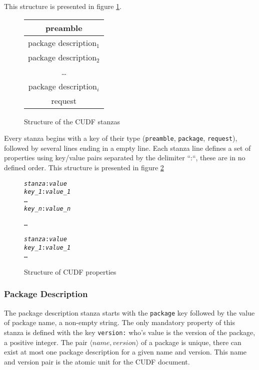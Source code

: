 This structure is presented in figure \ref{formal:cudfstruct}.

\begin{figure}[htp]
\centering
\begin{tabular}{|c|}
\hline preamble \\ \hline
\hline package description$_{1}$ \\ \hline
\hline package description$_{2}$ \\ \hline
 \multicolumn{1}{c}{\ldots}  \\ 
\hline package description$_{i}$\\ \hline
\hline request\\ \hline
\end{tabular}
\caption{Structure of the CUDF stanzas}
\label{formal:cudfstruct}
\end{figure}

Every stanza begins with a key of their type (\verb+preamble+, \verb+package+, \verb+request+), followed by several lines ending in a empty line.
Each stanza line defines a set of properties using key/value pairs separated by the delimiter ``:``, these are in no defined order.
This structure is presented in figure \ref{formal.cudfproperties}

\begin{figure}[htp] 
\begin{center}
\begin{alltt}
\textit{stanza}: \textit{value}
\textit{key_1}: \textit{value_1}
\ldots
\textit{key_n}: \textit{value_n}

\ldots

\textit{stanza}: \textit{value}
\textit{key_1}: \textit{value_1}
\ldots
\end{alltt}
  \caption[CUDF property structure]{Structure of CUDF properties}
  \label{formal.cudfproperties}
\end{center}
\end{figure}

\subsubsection{Package Description}
The package description stanza starts with the \verb+package+ key followed by the value of package name, a non-empty string.
The only mandatory property of this stanza is defined with the key \verb+version:+ who's value is the version of the package, a positive integer.
The pair $\langle name, version \rangle$ of a package is unique, there can exist at most one package description for a given name and version.
This name and version pair is the atomic unit for the CUDF document. 

